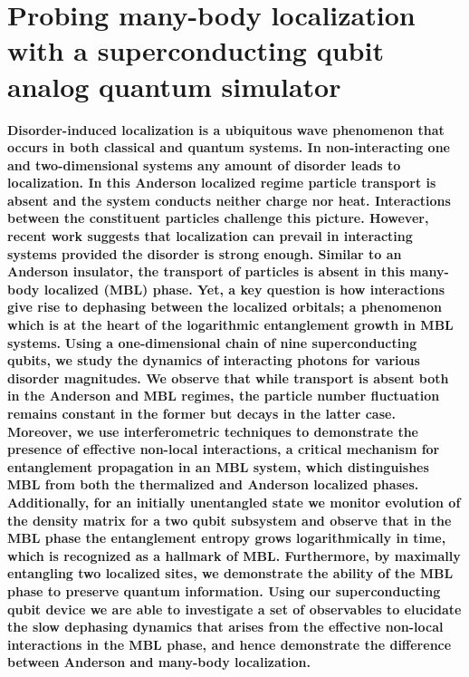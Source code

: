 
\chapter[MBL]{Probing many-body localization with a superconducting qubit analog quantum simulator}

\textbf{
    Disorder-induced localization is a ubiquitous wave phenomenon that occurs in both classical and quantum systems.
    In non-interacting one and two-dimensional systems any amount of disorder leads to localization.\autocite{Anderson1958, Abrahams1979}
    In this Anderson localized regime particle transport is absent and the system conducts neither charge nor heat.
    Interactions between the constituent particles challenge this picture. However, recent work suggests that localization can prevail in interacting systems provided the disorder is strong enough.\autocite{Nandkishore2015, Altman2015,  Basko2006, Gornyi2005}
    Similar to an Anderson insulator, the transport of particles is absent in this many-body localized (MBL) phase.
    Yet, a key question is how interactions give rise to dephasing between the localized orbitals; a phenomenon which is at the heart of the logarithmic entanglement growth in MBL systems.\autocite{Bardarson2012, Serbyn2013, Huse2014}
}
\textbf{
    Using a one-dimensional chain of nine superconducting qubits\autocite{Neill2018},
    we study the dynamics of interacting photons for various disorder magnitudes. We observe that while transport is absent both in the Anderson and MBL regimes,
    the particle number fluctuation remains constant in the former but decays in the latter case. Moreover, we use interferometric techniques to demonstrate the presence of effective non-local interactions, a critical mechanism for entanglement propagation in an MBL system, which distinguishes MBL from both the thermalized and Anderson localized phases.
    Additionally, for an initially unentangled state we monitor evolution of the density matrix for a two qubit subsystem
    and observe that in the MBL phase the entanglement entropy grows logarithmically in time, which is recognized as a hallmark of MBL.
    Furthermore, by maximally entangling two localized sites, we demonstrate the ability of the MBL phase to preserve quantum information.
    Using our superconducting qubit device we are able to investigate a set of observables to elucidate the slow dephasing dynamics that arises from the effective non-local interactions in the MBL phase, and hence
    demonstrate the difference between Anderson and many-body localization.}

